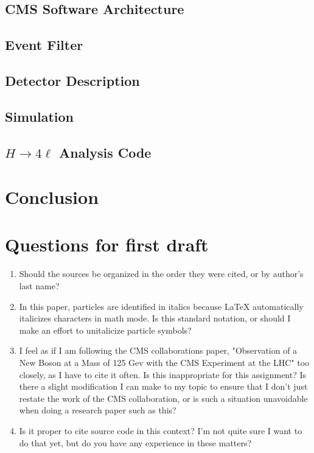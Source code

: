 \documentclass[12pt]{article}
\begin{document}
\subsection{CMS Software Architecture}
\subsection{Event Filter}
\subsection{Detector Description}
\subsection{Simulation}
\subsection{$H \to 4 \ell$ Analysis Code}
\section{Conclusion}






\section{Questions for first draft}
\begin{enumerate}
\item Should the sources be organized in the order they were cited, or by author's last name?
\item In this paper, particles are identified in italics because \LaTeX \; automatically italicizes characters in math mode. Is this standard notation, or should I make an effort to unitalicize particle symbols?
\item I feel as if I am following the CMS collaborations paper, "Observation of a New Boson at a Mass of 125 Gev with the CMS Experiment at the LHC" too closely, as I have to cite it often. Is this inappropriate for this assignment? Is there a slight modification I can make to my topic to ensure that I don't just restate the work of the CMS collaboration, or is such a situation unavoidable when doing a research paper such as this?
\item Is it proper to cite source code in this context? I'm not quite sure I want to do that yet, but do you have any experience in these matters?


 
\end{enumerate}
\end{document}
